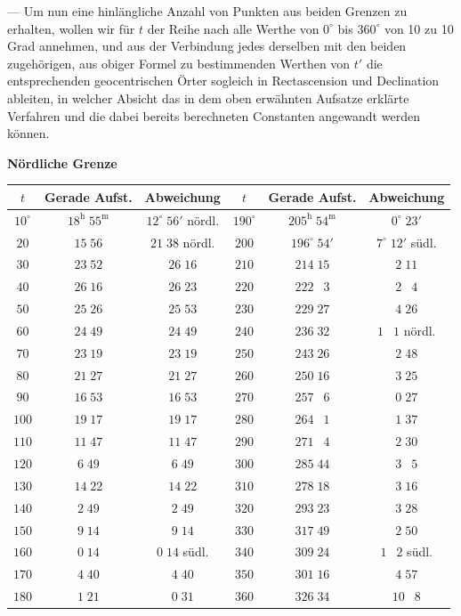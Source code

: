 \documentclass[12pt,a4paper]{article}
\begin{document}
--- Um nun eine hinlängliche Anzahl von Punkten aus beiden Grenzen
zu erhalten, wollen wir für $t$ der Reihe nach alle Werthe von $0^{\circ}$ bis $360^{\circ}$
von 10 zu 10 Grad annehmen, und aus der Verbindung jedes derselben mit
den beiden zugehörigen, aus obiger Formel zu bestimmenden Werthen von $t'$
die entsprechenden geocentrischen Örter sogleich in Rectascension und Declination
ableiten, in welcher Absicht das in dem oben erwähnten Aufsatze erklärte
Verfahren und die dabei bereits berechneten Constanten angewandt werden können.

\begin{center}
\small
\textbf{Nördliche Grenze}\\[4pt]
\begin{tabular}{|c|c|c||c|c|c|}
\hline
$t$ & Gerade Aufst. & Abweichung & $t$ & Gerade Aufst. & Abweichung \\
\hline
$10^{\circ}$ & $18^{\text{h}}\;55^{\text{m}}$ & $12^{\circ}\;56'$ nördl.
& $190^{\circ}$ & $205^{\text{h}}\;54^{\text{m}}$ & $0^{\circ}\;23'$\\
$20$ & $15\;56$ & $21\;38$ nördl.
& $200$ & $196^{\circ}\;54'$ & $7^{\circ}\;12'$ südl.\\
$30$ & $23\;52$ & $26\;16$ 
& $210$ & $214\;15$ & $2\;11$\\
$40$ & $26\;16$ & $26\;23$ 
& $220$ & $222\;\phantom{0}3$ & $2\;\phantom{0}4$\\
$50$ & $25\;26$ & $25\;53$ 
& $230$ & $229\;27$ & $4\;26$\\
$60$ & $24\;49$ & $24\;49$ 
& $240$ & $236\;32$ & $1\;\phantom{0}1$ nördl.\\
$70$ & $23\;19$ & $23\;19$ 
& $250$ & $243\;26$ & $2\;48$\\
$80$ & $21\;27$ & $21\;27$ 
& $260$ & $250\;16$ & $3\;25$\\
$90$ & $16\;53$ & $16\;53$ 
& $270$ & $257\;\phantom{0}6$ & $0\;27$\\
$100$ & $19\;17$ & $19\;17$ 
& $280$ & $264\;\phantom{0}1$ & $1\;37$\\
$110$ & $11\;47$ & $11\;47$ 
& $290$ & $271\;\phantom{0}4$ & $2\;30$\\
$120$ & $6\;49$ & $6\;49$ 
& $300$ & $285\;44$ & $3\;\phantom{0}5$\\
$130$ & $14\;22$ & $14\;22$ 
& $310$ & $278\;18$ & $3\;16$\\
$140$ & $2\;49$ & $2\;49$ 
& $320$ & $293\;23$ & $3\;28$\\
$150$ & $9\;14$ & $9\;14$ 
& $330$ & $317\;49$ & $2\;50$\\
$160$ & $0\;14$ & $0\;14$ südl.
& $340$ & $309\;24$ & $1\;\phantom{0}2$ südl.\\
$170$ & $4\;40$ & $4\;40$ 
& $350$ & $301\;16$ & $4\;57$\\
$180$ & $1\;21$ & $0\;31$ 
& $360$ & $326\;34$ & $10\;\phantom{0}8$\\
\hline
\end{tabular}
\end{center}
\end{document}
